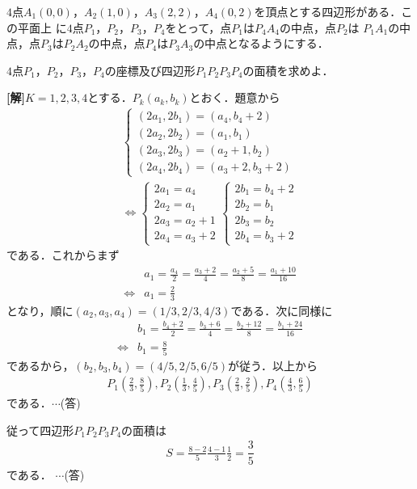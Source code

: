 \documentclass[a4j]{jarticle}
\begin{document}

     \begin{oframed}
     $4$点$A_1(0,0)$，$A_2(1,0)$，$A_3(2,2)$，$A_4(0,2)$を頂点とする四辺形がある．この平面上
     に$4$点$P_1$，$P_2$，$P_3$，$P_4$をとって，点$P_1$は$P_4A_4$の中点，点$P_2$は
     $P_1A_1$の中点，点$P_3$は$P_2A_2$の中点，点$P_4$は$P_3A_3$の中点となるようにする．
     
     $4$点$P_1$，$P_2$，$P_3$，$P_4$の座標及び四辺形$P_1P_2P_3P_4$の面積を求めよ．
     \end{oframed}

\setlength{\columnseprule}{0.4pt}
\begin{multicols}{2}
{\bf[解]}$K=1,2,3,4$とする．$P_k(a_k,b_k)$とおく．題意から
     \begin{align*}
     \left\{
          \begin{array}{l}
          (2a_1,2b_1)=(a_4,b_4+2)  \\
          (2a_2,2b_2)=(a_1,b_1) \\
          (2a_3,2b_3)=(a_2+1,b_2)  \\
          (2a_4,2b_4)=(a_3+2,b_3+2)
          \end{array}
     \right. \\
     \Longleftrightarrow
     \left\{
          \begin{array}{l}
          2a_1=a_4  \\
          2a_2=a_1 \\
          2a_3=a_2+1  \\
          2a_4=a_3+2
          \end{array}
     \right.     
     \left\{
          \begin{array}{l}
          2b_1=b_4+2  \\
          2b_2=b_1 \\
          2b_3=b_2  \\
          2b_4=b_3+2
          \end{array}
     \right.     
     \end{align*}
である．これからまず
     \begin{align*}
     &a_1=\frac{a_4}{2}=\frac{a_3+2}{4}=\frac{a_2+5}{8}=\frac{a_1+10}{16} \\\Longleftrightarrow 
     &a_1=\frac{2}{3}     
     \end{align*}
となり，順に$(a_2,a_3,a_4)=(1/3,2/3,4/3)$である．次に同様に
     \begin{align*}
     &b_1=\frac{b_4+2}{2}=\frac{b_3+6}{4}=\frac{b_2+12}{8}=\frac{b_1+24}{16}\\ \Longleftrightarrow
     &b_1=\frac{8}{5}
     \end{align*}
であるから，$(b_2,b_3,b_4)=(4/5,2/5,6/5)$が従う．以上から
     \begin{align*}
     P_1\left(\frac{2}{3},\frac{8}{5}\right) , P_2\left(\frac{1}{3},\frac{4}{5}\right) ,
     P_3\left(\frac{2}{3},\frac{2}{5}\right) , P_4\left(\frac{4}{3},\frac{6}{5}\right)
     \end{align*}
 である．$\cdots$(答)
 
 従って四辺形$P_1P_2P_3P_4$の面積は
      \begin{align*}
      S=\frac{8-2}{5}\frac{4-1}{3}\frac{1}{2}=\dfrac{3}{5}
      \end{align*}
      である．
 $\cdots$(答)
\newpage
\end{multicols}
\end{document}

